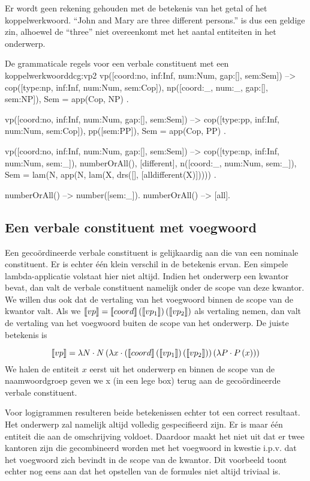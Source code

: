 Er wordt geen rekening gehouden met de betekenis van het getal of het koppelwerkwoord. ``John and Mary are three different persons.'' is dus een geldige zin, alhoewel de ``three'' niet overeenkomt met het aantal entiteiten in het onderwerp.

\begin{dcg}{De grammaticale regels voor een verbale constituent met een koppelwerkwoord}{dcg:vp2}
vp([coord:no, inf:Inf, num:Num, gap:[], sem:Sem]) -->
  cop([type:np, inf:Inf, num:Num, sem:Cop]),
  np([coord:_, num:_, gap:[], sem:NP]),
  { Sem = app(Cop, NP) }.

vp([coord:no, inf:Inf, num:Num, gap:[], sem:Sem]) -->
  cop([type:pp, inf:Inf, num:Num, sem:Cop]),
  pp([sem:PP]),
  { Sem = app(Cop, PP) }.

vp([coord:no, inf:Inf, num:Num, gap:[], sem:Sem]) -->
  cop([type:np, inf:Inf, num:Num, sem:_]),
  numberOrAll(),
  [different],
  n([coord:_, num:Num, sem:_]),
  { Sem = lam(N, app(N, lam(X, drs([], [alldifferent(X)])))) }.

numberOrAll() -->
  number([sem:_]).
numberOrAll() -->
  [all].
\end{dcg}

\subsection{Een verbale constituent met voegwoord}
Een gecoördineerde verbale constituent is gelijkaardig aan die van een nominale constituent. Er is echter één klein verschil in de betekenis ervan. Een simpele lambda-applicatie volstaat hier niet altijd. Indien het onderwerp een kwantor bevat, dan valt de verbale constituent namelijk onder de scope van deze kwantor. We willen dus ook dat de vertaling van het voegwoord binnen de scope van de kwantor valt. Als we $\llbracket vp\rrbracket = \llbracket coord\rrbracket \left( \llbracket vp_1\rrbracket \right) \left( \llbracket vp_2\rrbracket \right)$ als vertaling nemen, dan valt de vertaling van het voegwoord buiten de scope van het onderwerp. De juiste betekenis is

$$\llbracket vp\rrbracket = \lambda N \cdot N \left( \lambda x \cdot \left( \llbracket coord\rrbracket \left( \llbracket vp_1\rrbracket \right) \left( \llbracket vp_2\rrbracket \right) \right) \left( \lambda P \cdot P \left( x \right) \right) \right)$$ We halen de entiteit $x$ eerst uit het onderwerp en binnen de scope van de naamwoordgroep geven we x (in een lege box) terug aan de gecoördineerde verbale constituent.

Voor logigrammen resulteren beide betekenissen echter tot een correct resultaat. Het onderwerp zal namelijk altijd volledig gespecifieerd zijn. Er is maar één entiteit die aan de omschrijving voldoet. Daardoor maakt het niet uit dat er twee kantoren zijn die gecombineerd worden met het voegwoord in kwestie i.p.v. dat het voegwoord zich bevindt in de scope van de kwantor. Dit voorbeeld toont echter nog eens aan dat het opstellen van de formules niet altijd triviaal is.


